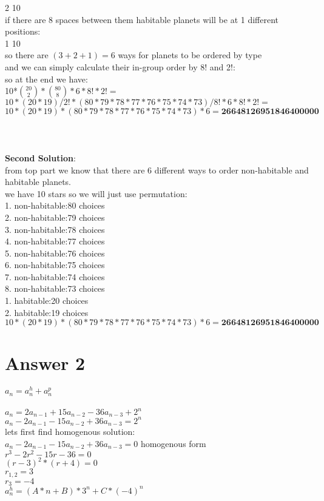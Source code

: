 \documentclass[11pt]{article}
\begin{document}
2 10\\
if there are 8 spaces between them habitable planets will be at 1 different positions:\\
1 10\\
so there are $(3+2+1)=6$ ways for planets to be ordered by type\\
and we can simply calculate their in-group order by 8! and 2!:\\
so at the end we have:\\
10*$\binom{20}{2}*\binom{80}{8}*6*8!*2!=$\\
$10*(20*19)/2!*(80*79*78*77*76*75*74*73)/8!*6*8!*2!=$\\
$10*(20*19)*(80*79*78*77*76*75*74*73)*6=\textbf{26648126951846400000}$\\
\\
\\
\\
\textbf{Second Solution}:\\
from top part we know that there are 6 different ways to order non-habitable and habitable planets.\\
we have 10 stars so we will just use permutation:\\
1. non-habitable:80 choices\\
2. non-habitable:79 choices\\
3. non-habitable:78 choices\\
4. non-habitable:77 choices\\
5. non-habitable:76 choices\\
6. non-habitable:75 choices\\
7. non-habitable:74 choices\\
8. non-habitable:73 choices\\
1. habitable:20 choices\\
2. habitable:19 choices\\
$10*(20*19)*(80*79*78*77*76*75*74*73)*6=\textbf{26648126951846400000}$\\

\section*{Answer 2}
$a_n=a_n^{h}+a_n^{p}$\\
\\
$a_n = 2a_{n-1} + 15a_{n-2} - 36a_{n-3} + 2^{n}$\\
$a_n - 2a_{n-1} - 15a_{n-2} + 36a_{n-3}=2^{n}$  \\
lets first find homogenous solution:\\
$a_n - 2a_{n-1} - 15a_{n-2} + 36a_{n-3}=0$    homogenous form\\
$r^{3}-2r^{2}-15r-36=0$\\
$(r-3)^{2}*(r+4)=0$\\
$r_{1,2}=3$\\
$r_{3}=-4$\\
$a_n^{h}=(A*n+B)*3^{n}+C*(-4)^n$\\
\end{document}
